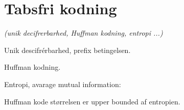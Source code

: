 \newpage
\section{Tabsfri kodning}
\textit{(unik decifrerbarhed, Huffman kodning, entropi ...)}

Unik descifrérbarhed, prefix betingelsen.

Huffman kodning.

Entropi, avarage mutual information:

Huffman kode størrelsen er upper bounded af entropien.
